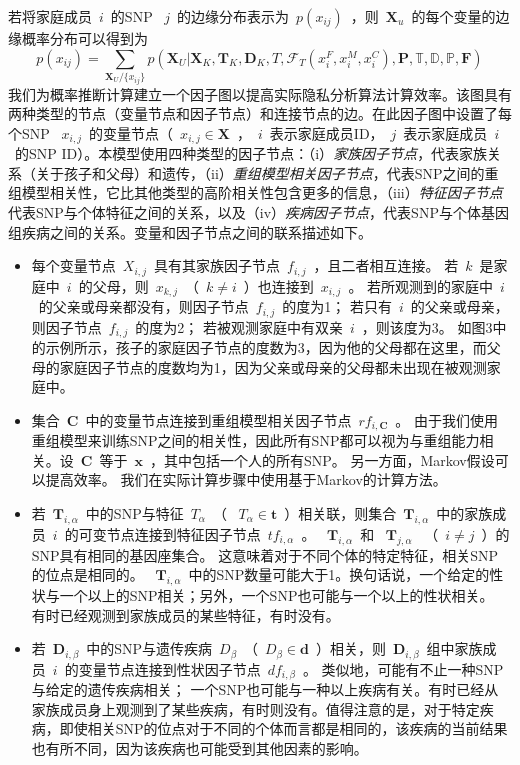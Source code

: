 \documentclass[pdftex,notypeinfo,twoside,openany,UTF8,fntef]{CASthesis}
\theoremstyle{THrm}{
	\newtheorem{question}{Question}[section]
	\newtheorem{property}{性质}[section]
	\newtheorem{assumption}{假设}[section]
	\newtheorem{claim}[lemma]{断言}
	
}
\begin{document}
若将家庭成员~$i$~的SNP ~$j$~的边缘分布表示为~$p(x_{ij})$~，则~$\mathbf{X}_u$~的每个变量的边缘概率分布可以得到为
\begin{equation}
p(x_{ij})= \sum_{\mathbf{X}_U/\{x_{ij}\}} p(\mathbf{X}_U | \mathbf{X}_K, \mathbf{T}_K, \mathbf{D}_K, T,  \mathcal{F}_T(x_i^F,x_i^M,x_i^C), \mathbf{P}, \mathbb{T}, \mathbb{D}, \mathbb{P}, \mathbf{F})
\end{equation}
我们为概率推断计算建立一个因子图以提高实际隐私分析算法计算效率。该图具有两种类型的节点（变量节点和因子节点）和连接节点的边。在此因子图中设置了每个SNP ~$x_{i,j}$~的变量节点（~$x_{i,j}\in \mathbf{X}$~，~$i$~表示家庭成员ID，~$j$~表示家庭成员~$i$~的SNP ID）。本模型使用四种类型的因子节点：（i）\emph{家族因子节点}，代表家族关系（关于孩子和父母）和遗传，（ii）\emph{重组模型相关因子节点}，代表SNP之间的重组模型相关性，它比其他类型的高阶相关性包含更多的信息，（iii）\emph{特征因子节点}代表SNP与个体特征之间的关系，以及（iv）\emph{疾病因子节点}，代表SNP与个体基因组疾病之间的关系。变量和因子节点之间的联系描述如下。

\begin{itemize}
	\item 每个变量节点~$X_{i,j}$~具有其家族因子节点~$f_{i,j}$~，且二者相互连接。 若~$k$~是家庭中~$i$~的父母，则~$x_{k,j}$~（~$k \neq i$~）也连接到~$x_{i,j}$~。 若所观测到的家庭中~$i$~的父亲或母亲都没有，则因子节点~$f_{i,j}$~的度为1； 若只有~$i$~的父亲或母亲，则因子节点~$f_{i,j}$~的度为2； 若被观测家庭中有双亲~$i$~，则该度为3。 如图3中的示例所示，孩子的家庭因子节点的度数为3，因为他的父母都在这里，而父母的家庭因子节点的度数均为1，因为父亲或母亲的父母都未出现在被观测家庭中。
	\item 集合~$\mathbf{C}$~中的变量节点连接到重组模型相关因子节点~$rf_{i,\mathbf{C}}$~。 由于我们使用重组模型来训练SNP之间的相关性，因此所有SNP都可以视为与重组能力相关。设~$\mathbf{C}$~等于~$\mathbf{x}$~，其中包括一个人的所有SNP。 另一方面，Markov假设可以提高效率。 我们在实际计算步骤中使用基于Markov的计算方法。
	\item 若~$\mathbf{T}_{i,\alpha}$~中的SNP与特征~$T_{\alpha}$~（ ~$T_{\alpha} \in \mathbf{t}$~）相关联，则集合~$\mathbf{T}_{i,\alpha}$~中的家族成员~$i$~的可变节点连接到特征因子节点~$tf_{i,\alpha}$~。 ~$\mathbf{T}_{i,\alpha}$~和 ~$\mathbf{T}_{j,\alpha}$~ （~$i \neq j$~）的SNP具有相同的基因座集合。 这意味着对于不同个体的特定特征，相关SNP的位点是相同的。 ~$\mathbf{T}_{i,\alpha}$~中的SNP数量可能大于1。换句话说，一个给定的性状与一个以上的SNP相关；另外，一个SNP也可能与一个以上的性状相关。 有时已经观测到家族成员的某些特征，有时没有。
	\item 若~$\mathbf{D}_{i,\beta}$~中的SNP与遗传疾病~$D_{\beta}$~（~$D_{\beta} \in \mathbf{d}$~）相关，则~$\mathbf{D}_{i,\beta}$~组中家族成员~$i$~的变量节点连接到性状因子节点~$df_{i,\beta}$~。 类似地，可能有不止一种SNP与给定的遗传疾病相关； 一个SNP也可能与一种以上疾病有关。有时已经从家族成员身上观测到了某些疾病，有时则没有。值得注意的是，对于特定疾病，即使相关SNP的位点对于不同的个体而言都是相同的，该疾病的当前结果也有所不同，因为该疾病也可能受到其他因素的影响。
	
\end{itemize}
\end{document}
